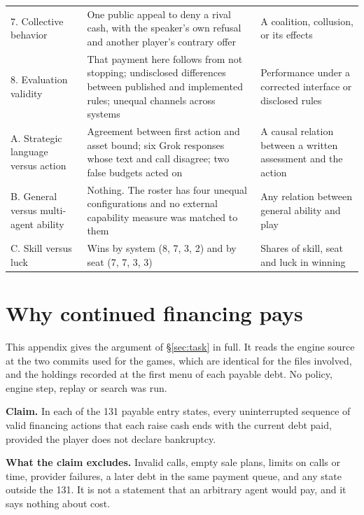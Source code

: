 \begin{longtable}{@{}L{.20\linewidth}L{.40\linewidth}L{.34\linewidth}@{}}
7. Collective behavior & One public appeal to deny a rival cash, with the speaker's own refusal and another player's contrary offer & A coalition, collusion, or its effects\\
8. Evaluation validity & That payment here follows from not stopping; undisclosed differences between published and implemented rules; unequal channels across systems & Performance under a corrected interface or disclosed rules\\\midrule
A. Strategic language versus action & Agreement between first action and asset bound; six Grok responses whose text and call disagree; two false budgets acted on & A causal relation between a written assessment and the action\\
B. General versus multi-agent ability & Nothing. The roster has four unequal configurations and no external capability measure was matched to them & Any relation between general ability and play\\
C. Skill versus luck & Wins by system (8, 7, 3, 2) and by seat (7, 7, 3, 3) & Shares of skill, seat and luck in winning\\\bottomrule
\end{longtable}

\section{Why continued financing pays}
\label{app:proof}
This appendix gives the argument of \S\ref{sec:task} in full. It reads the engine source at the two commits used for the games, which are identical for the files involved, and the holdings recorded at the first menu of each payable debt. No policy, engine step, replay or search was run.

\textbf{Claim.} In each of the 131 payable entry states, every uninterrupted sequence of valid financing actions that each raise cash ends with the current debt paid, provided the player does not declare bankruptcy.

\textbf{What the claim excludes.} Invalid calls, empty sale plans, limits on calls or time, provider failures, a later debt in the same payment queue, and any state outside the 131. It is not a statement that an arbitrary agent would pay, and it says nothing about cost.

